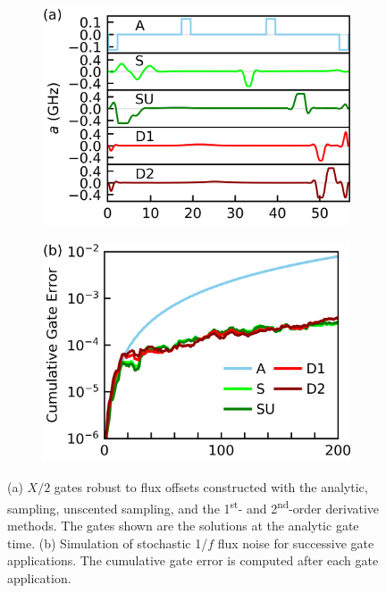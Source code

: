 \begin{figure}[ht]
  \begin{subfigure}{.4\textwidth}
    \includegraphics[width=\linewidth]{assets/f3a.png}
  \end{subfigure}\hspace{0.025\textwidth}
  \begin{subfigure}{.4\textwidth}
    \includegraphics[width=\linewidth]{assets/f3b.png}
  \end{subfigure}
  \caption{
    (a) $X/2$ gates robust to flux offsets constructed with the analytic,
    sampling, unscented sampling, and the 1\textsuperscript{st}-
    and 2\textsuperscript{nd}-order derivative methods. The gates shown
    are the solutions at the analytic gate time.
    (b) Simulation of stochastic 1/$f$ flux noise for
    successive gate applications. The cumulative
    gate error is computed after each gate application.
  }
  \label{fig:stochastic}
\end{figure}

